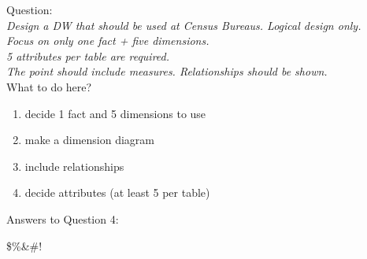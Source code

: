 Question:\\
\emph{
    Design a DW that should be used at Census Bureaus. Logical design only.\\ Focus on only
one fact + five dimensions.\\ 5 attributes per table are required.\\ The point should include
measures. Relationships should be shown.
}\\

What to do here?
\begin{enumerate}
    \item decide 1 fact and 5 dimensions to use
    \item make a dimension diagram
    \item include relationships
    \item decide attributes (at least 5 per table)
  \end{enumerate}

\newpage Answers to Question 4:

\newpage 
\$\%\&\#!